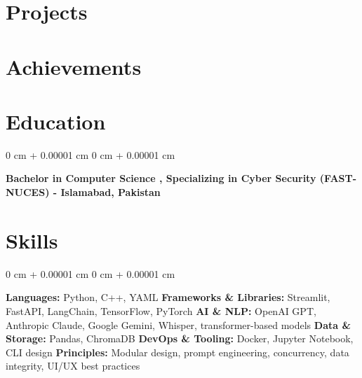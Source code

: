 \documentclass[10pt, letterpaper]{article}
\newenvironment{onecolentry}{
    \begin{adjustwidth}{
        0 cm + 0.00001 cm
    }{
        0 cm + 0.00001 cm
    }
}{
    \end{adjustwidth}
}
\begin{document}
\section{Projects}
\vspace{0.10 cm}

\section{Achievements}
\vspace{0.10 cm}

\section{Education}
\vspace{0.10 cm}
\begin{onecolentry}
    \textbf{Bachelor in Computer Science , Specializing in Cyber Security (FAST-NUCES) - Islamabad, Pakistan}
\end{onecolentry}

\section{Skills}
\vspace{0.10 cm}
\begin{onecolentry}
    \textbf{Languages:} Python, C++, YAML
    \vspace{0.1cm}
    \textbf{Frameworks \& Libraries:} Streamlit, FastAPI, LangChain, TensorFlow, PyTorch
    \vspace{0.1cm}
    \textbf{AI \& NLP:} OpenAI GPT, Anthropic Claude, Google Gemini, Whisper, transformer-based models
    \vspace{0.1cm}
    \textbf{Data \& Storage:} Pandas, ChromaDB
    \vspace{0.1cm}
    \textbf{DevOps \& Tooling:} Docker, Jupyter Notebook, CLI design
    \vspace{0.1cm}
    \textbf{Principles:} Modular design, prompt engineering, concurrency, data integrity, UI/UX best practices
\end{onecolentry}
\end{document}
